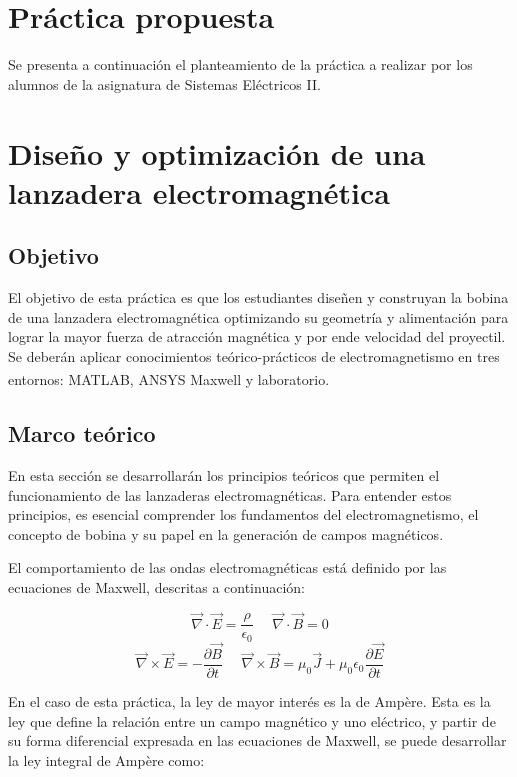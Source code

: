 \section{Práctica propuesta}
\label{sec:practica}

Se presenta a continuación el planteamiento de la práctica a realizar por los alumnos de la asignatura de Sistemas Eléctricos II.

\newpage

\section*{Diseño y optimización de una lanzadera electromagnética}

\subsection*{Objetivo}

El objetivo de esta práctica es que los estudiantes diseñen y construyan la bobina de una lanzadera electromagnética optimizando su geometría y alimentación para lograr la mayor fuerza de atracción magnética y por ende velocidad del proyectil. Se deberán aplicar conocimientos teórico-prácticos de electromagnetismo en tres entornos: MATLAB\textsuperscript{\textregistered}, ANSYS Maxwell\textsuperscript{\textregistered} y laboratorio.

\subsection*{Marco teórico}

En esta sección se desarrollarán los principios teóricos que permiten el funcionamiento de las lanzaderas electromagnéticas. Para entender estos principios, es esencial comprender los fundamentos del electromagnetismo, el concepto de bobina y su papel en la generación de campos magnéticos.

El comportamiento de las ondas electromagnéticas está definido por las ecuaciones de Maxwell, descritas a continuación:
\begin{figure}[H]
    \centering
    \[
    \vec{\nabla}\cdot \vec{E}= \frac{\rho}{\epsilon_0}~~~~~~\vec{\nabla}\cdot \vec{B}= 0
    \]
    \[
    \vec{\nabla}\times\vec{E}=-\frac{\partial\vec{B}}{\partial t}~~~~~~\vec{\nabla}\times \vec{B}=\mu_0\vec{J}+\mu_0\epsilon_0\frac{\partial \vec{E}}{\partial t}
    \]
\end{figure}

En el caso de esta práctica, la ley de mayor interés es la de Ampère. Esta es la ley que define la relación entre un campo magnético y uno eléctrico, y partir de su forma diferencial expresada en las ecuaciones de Maxwell, se puede desarrollar la ley integral de Ampère como:

